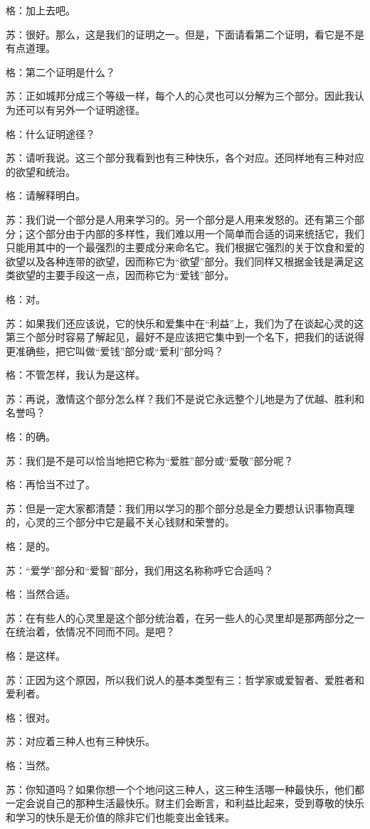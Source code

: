 \documentclass[12pt,oneside]{book}
\begin{document}
格：加上去吧。

苏：很好。那么，这是我们的证明之一。但是，下面请看第二个证明，看它是不是有点道理。

格：第二个证明是什么？

苏：正如城邦分成三个等级一样，每个人的心灵也可以分解为三个部分。因此我认为还可以有另外一个证明途径。

格：什么证明途径？

苏：请听我说。这三个部分我看到也有三种快乐，各个对应。还同样地有三种对应的欲望和统治。

格：请解释明白。

苏：我们说一个部分是人用来学习的。另一个部分是人用来发怒的。还有第三个部分；这个部分由于内部的多样性，我们难以用一个简单而合适的词来统括它，我们只能用其中的一个最强烈的主要成分来命名它。我们根据它强烈的关于饮食和爱的欲望以及各种连带的欲望，因而称它为“欲望”部分。我们同样又根据金钱是满足这类欲望的主要手段这一点，因而称它为“爱钱”部分。

格：对。

苏：如果我们还应该说，它的快乐和爱集中在“利益”上，我们为了在谈起心灵的这第三个部分时容易了解起见，最好不是应该把它集中到一个名下，把我们的话说得更准确些，把它叫做“爱钱”部分或“爱利”部分吗？

格：不管怎样，我认为是这样。

苏：再说，激情这个部分怎么样？我们不是说它永远整个儿地是为了优越、胜利和名誉吗？

格：的确。

苏：我们是不是可以恰当地把它称为“爱胜”部分或“爱敬”部分呢？

格：再恰当不过了。

苏：但是一定大家都清楚：我们用以学习的那个部分总是全力要想认识事物真理的，心灵的三个部分中它是最不关心钱财和荣誉的。

格：是的。

苏：“爱学”部分和“爱智”部分，我们用这名称称呼它合适吗？

格：当然合适。

苏：在有些人的心灵里是这个部分统治着，在另一些人的心灵里却是那两部分之一在统治着，依情况不同而不同。是吧？

格：是这样。

苏：正因为这个原因，所以我们说人的基本类型有三：哲学家或爱智者、爱胜者和爱利者。

格：很对。

苏：对应着三种人也有三种快乐。

格：当然。

苏：你知道吗？如果你想一个个地问这三种人，这三种生活哪一种最快乐，他们都一定会说自己的那种生活最快乐。财主们会断言，和利益比起来，受到尊敬的快乐和学习的快乐是无价值的除非它们也能变出金钱来。
\end{document}
